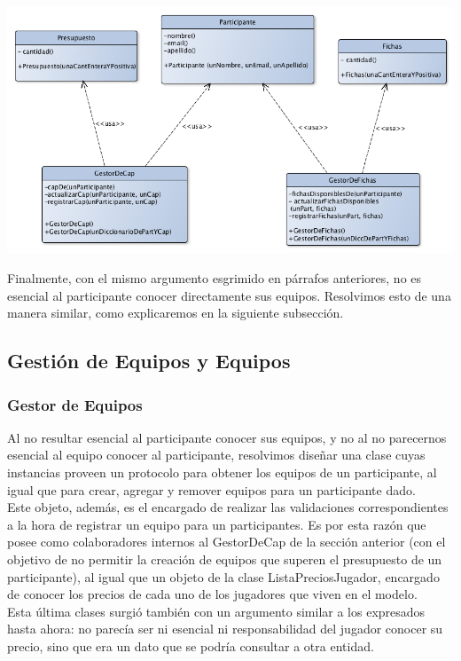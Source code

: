 \begin{center}
\includegraphics[scale=0.4]{diseno/gestorDeCapYFichas.png} 
\end{center}

Finalmente, con el mismo argumento esgrimido en párrafos anteriores, no es esencial al participante conocer directamente sus equipos. Resolvimos esto de una manera similar, como explicaremos en la siguiente subsección.\\


\subsection{Gestión de Equipos y Equipos}

\subsubsection{Gestor de Equipos}
Al no resultar esencial al participante conocer sus equipos, y no al no parecernos esencial al equipo conocer al participante, resolvimos diseñar una clase cuyas instancias proveen un protocolo para obtener los equipos de un participante, al igual que para crear, agregar y remover equipos para un participante dado.\\
Este objeto, además, es el encargado de realizar las validaciones correspondientes a la hora de registrar un equipo para un participantes. Es por esta razón que posee como colaboradores internos al GestorDeCap de la sección anterior (con el objetivo de no permitir la creación de equipos que superen el presupuesto de un participante), al igual que un objeto de la clase ListaPreciosJugador, encargado de conocer los precios de cada uno de los jugadores que viven en el modelo.\\
Esta última clases surgió también con un argumento similar a los expresados hasta ahora: no parecía ser ni esencial ni responsabilidad del jugador conocer su precio, sino que era un dato que se podría consultar a otra entidad.\\

